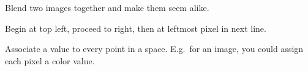 \begin{definition}
    Blend two images together and make them seem alike.
\end{definition}

\begin{definition}
    Begin at top left, proceed to right, then at leftmost pixel in next line.
\end{definition}

\begin{definition}\label{scalarfield}
    Associate a value to every point in a space. E.g.\ for an image, you
    could assign each pixel a color value.
\end{definition}

